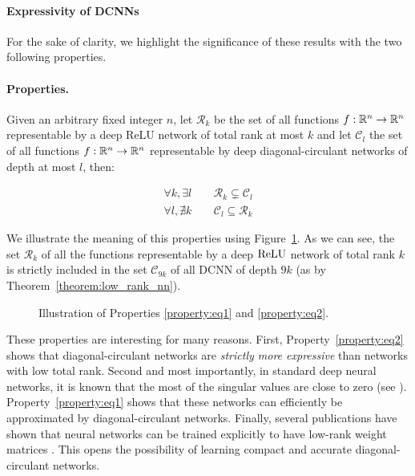 \paragraph{Expressivity of DCNNs}

For the sake of clarity, we highlight the significance of these results with the two following properties.

\paragraph{Properties.}
Given an arbitrary fixed integer $n$, let $\mathcal{R}_{k}$ be the set of all functions $f:{\mathbb{R}}^{n} \rightarrow {\ensuremath \mathbb{R}}^{n}$ representable by a deep ReLU network of total rank at most $k$ and let $\mathcal{C}_{l}$ the set of all functions $f:{\mathbb{R}}^{n} \rightarrow {\ensuremath \mathbb{R}}^{n}$ representable by deep diagonal-circulant networks of depth at most $l$, then:

\begin{align}
  \label{property:eq1} \forall k,\exists l \, &\quad \mathcal{R}_{k} \subsetneq \mathcal{C}_{l} \\
  \label{property:eq2} \forall l,\nexists k\, &\quad \mathcal{C}_{l} \subseteq \mathcal{R}_{k}
\end{align}

We illustrate the meaning of this properties using Figure~\ref{fig:circfig}.
As we can see, the set $\mathcal R_{k}$ of all the functions representable by a deep $\operatorname{ReLU}$ network of total rank $k$ is strictly included in the set $\mathcal C_{9k}$ of all DCNN of depth $9k$ (as by Theorem~\ref{theorem:low_rank_nn}).

\begin{figure}[htb]
    \begin{center}
      
    \end{center}
    \caption{Illustration of Properties \ref{property:eq1} and \ref{property:eq2}.}
    \label{fig:circfig}
\end{figure}

These properties are interesting for many reasons. 
First, Property~\ref{property:eq2} shows that diagonal-circulant networks are \emph{strictly more expressive} than networks with low total rank. 
Second and most importantly, in standard deep neural networks, it is known that the most of the singular values are close to zero (see \eg \citet{Sedghi18iclr,Arora19neurips}).
Property~\ref{property:eq1} shows that these networks can efficiently be approximated by diagonal-circulant networks.
Finally, several publications have shown that neural networks can be trained explicitly to have low-rank weight matrices \cite{chong18eccv, goyal19}.
This opens the possibility of learning compact and accurate diagonal-circulant networks.



